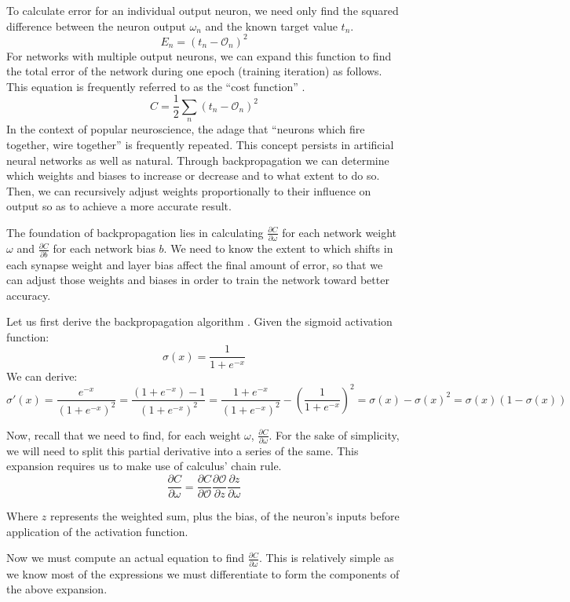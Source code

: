 \documentclass{article}
\begin{document}
To calculate error for an individual output neuron, we need only find the squared difference between the neuron output $\omega_n$ and the known target value $t_n$.
$$E_n=(t_n-\mathcal{O}_n)^2$$
For networks with multiple output neurons, we can expand this function to find the total error of the network during one epoch (training iteration) as follows. This equation is frequently referred to as the ``cost function'' \cite{mediummlbasics}.
$$C=\frac{1}{2}\sum_n(t_n-\mathcal{O}_n)^2$$
In the context of popular neuroscience, the adage that ``neurons which fire together, wire together'' is frequently repeated. This concept persists in artificial neural networks as well as natural. Through backpropagation we can determine which weights and biases to increase or decrease and to what extent to do so. Then, we can recursively adjust weights proportionally to their influence on output so as to achieve a more accurate result.

The foundation of backpropagation lies in calculating $\frac{\partial{C}}{\partial{\omega}}$ for each network weight $\omega$ and $\frac{\partial{C}}{\partial{b}}$ for each network bias $b$. We need to know the extent to which shifts in each synapse weight and layer bias affect the final amount of error, so that we can adjust those weights and biases in order to train the network toward better accuracy.

Let us first derive the backpropagation algorithm \cite{derivebackprop}. Given the sigmoid activation function:
$$\sigma(x)=\frac{1}{1+e^{-x}}$$
We can derive:
$$\sigma'(x)=\frac{e^{-x}}{(1+e^{-x})^2}=\frac{(1+e^{-x})-1}{(1+e^{-x})^2}=\frac{1+e^{-x}}{(1+e^{-x})^2}-\left(\frac{1}{1+e^{-x}}\right)^2=\sigma(x)-\sigma(x)^2=\sigma(x)(1-\sigma(x))$$

Now, recall that we need to find, for each weight $\omega$, $\frac{\partial{C}}{\partial{\omega}}$. For the sake of simplicity, we will need to split this partial derivative into a series of the same. This expansion requires us to make use of calculus' chain rule.
$$\frac{\partial{C}}{\partial{\omega}}=\frac{ \partial{C} }{ \partial{\mathcal{O}} }
                                        \frac{ \partial{\mathcal{O}} }{ \partial{z} }
                                         \frac{ \partial{z} }{ \partial{\omega} }$$

Where $z$ represents the weighted sum, plus the bias, of the neuron's inputs before application of the activation function.

Now we must compute an actual equation to find $\frac{\partial{C}}{\partial{\omega}}$. This is relatively simple as we know most of the expressions we must differentiate to form the components of the above expansion.
\end{document}

